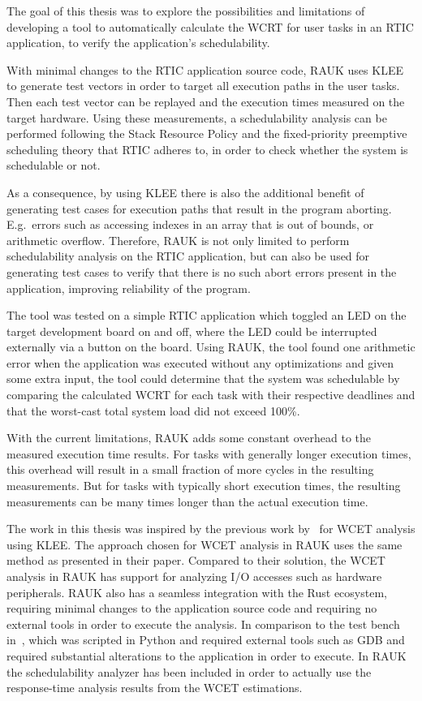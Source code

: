 The goal of this thesis was to explore the possibilities and limitations of
developing a tool to automatically calculate the WCRT for user tasks in an
RTIC application, to verify the application's schedulability.

With minimal changes to the RTIC application source code, RAUK uses KLEE to
generate test vectors in order to target all execution paths in the user tasks.
Then each test vector can be replayed and the execution times measured on the
target hardware. Using these measurements, a schedulability analysis can be
performed following the Stack Resource Policy and the fixed-priority preemptive
scheduling theory that RTIC adheres to, in order to check whether the system is
schedulable or not.

As a consequence, by using KLEE there is also the additional benefit of
generating test cases for execution paths that result in the program aborting.
E.g.\ errors such as accessing indexes in an array that is out of bounds, or
arithmetic overflow. Therefore, RAUK is not only limited to perform
schedulability analysis on the RTIC application, but can also be used for
generating test cases to verify that there is no such abort errors present in
the application, improving reliability of the program.

The tool was tested on a simple RTIC application which toggled an LED on the
target development board on and off, where the LED could be interrupted
externally via a button on the board. Using RAUK, the tool found one arithmetic
error when the application was executed without any optimizations and given
some extra input, the tool could determine that the system was schedulable by
comparing the calculated WCRT for each task with their respective deadlines and
that the worst-cast total system load did not exceed 100\%.

With the current limitations, RAUK adds some constant overhead to the measured
execution time results. For tasks with generally longer execution times, this
overhead will result in a small fraction of more cycles in the resulting
measurements. But for tasks with typically short execution times, the resulting
measurements can be many times longer than the actual execution time.

The work in this thesis was inspired by the previous work by~\cite{lindner} for
WCET analysis using KLEE\@. The approach chosen for WCET analysis in RAUK uses
the same method as presented in their paper. Compared to their solution, the WCET
analysis in RAUK has support for analyzing I/O accesses such as hardware
peripherals. RAUK also has a seamless integration with the Rust ecosystem,
requiring minimal changes to the application source code and requiring no
external tools in order to execute the analysis. In comparison to the test
bench in~\cite{lindner}, which was scripted in Python and required external
tools such as GDB and required substantial alterations to the application in
order to execute. In RAUK the schedulability analyzer has been included in
order to actually use the response-time analysis results from the WCET
estimations.

